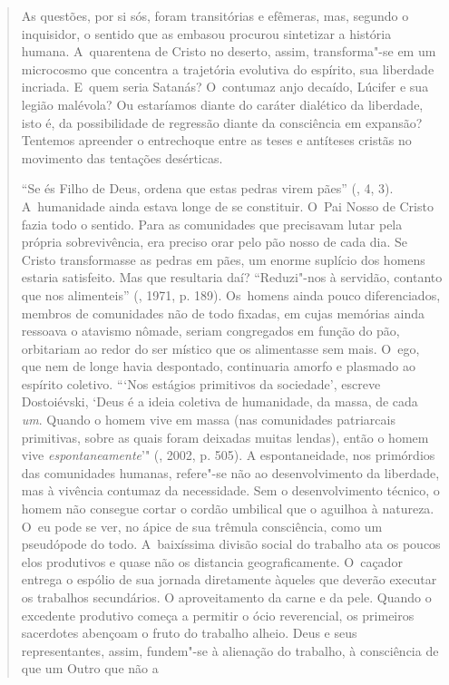 {\begin{quote}
As questões, por si sós, foram transitórias e efêmeras, mas, segundo o
inquisidor, o sentido que as embasou procurou sintetizar a história
humana. A~quarentena de Cristo no deserto, assim, transforma"-se em um
microcosmo que concentra a trajetória evolutiva do espírito, sua
liberdade incriada. E~quem seria Satanás? O~contumaz anjo decaído,
Lúcifer e sua legião malévola? Ou estaríamos diante do caráter dialético
da liberdade, isto é, da possibilidade de regressão diante da
consciência em expansão? Tentemos apreender o entrechoque entre as teses
e antíteses cristãs no movimento das tentações desérticas.

``Se és Filho de Deus, ordena que estas pedras virem pães'' (, 4,
3). A~humanidade ainda estava longe de se constituir. O~Pai Nosso de
Cristo fazia todo o sentido. Para as comunidades que precisavam lutar
pela própria sobrevivência, era preciso orar pelo pão nosso de cada dia.
Se Cristo transformasse as pedras em pães, um enorme suplício dos homens
estaria satisfeito. Mas que resultaria daí? ``Reduzi"-nos à servidão,
contanto que nos alimenteis'' (, 1971, p. 189). Os~homens
ainda pouco diferenciados, membros de comunidades não de todo fixadas,
em cujas memórias ainda ressoava o atavismo nômade, seriam congregados
em função do pão, orbitariam ao redor do ser místico que os alimentasse
sem mais. O~ego, que nem de longe havia despontado, continuaria amorfo e
plasmado ao espírito coletivo. ```Nos estágios primitivos da sociedade',
escreve Dostoiévski, `Deus é a ideia coletiva de humanidade, da massa,
de cada \emph{um}. Quando o homem vive em massa (nas comunidades
patriarcais primitivas, sobre as quais foram deixadas muitas lendas),
então o homem vive \emph{espontaneamente}'" (, 2002, p. 505). A
espontaneidade, nos primórdios das comunidades humanas, refere"-se não ao
desenvolvimento da liberdade, mas à vivência contumaz da necessidade.
Sem o desenvolvimento técnico, o homem não consegue cortar o cordão
umbilical que o aguilhoa à natureza. O~eu pode se ver, no ápice de sua
trêmula consciência, como um pseudópode do todo. A~baixíssima divisão
social do trabalho ata os poucos elos produtivos e quase não os
distancia geograficamente. O~caçador entrega o espólio de sua jornada
diretamente àqueles que deverão executar os trabalhos secundários. O
aproveitamento da carne e da pele. Quando o excedente produtivo começa a
permitir o ócio reverencial, os primeiros sacerdotes abençoam o fruto do
trabalho alheio. Deus e seus representantes, assim, fundem"-se à
alienação do trabalho, à consciência de que um Outro que não a

\end{quote}}
